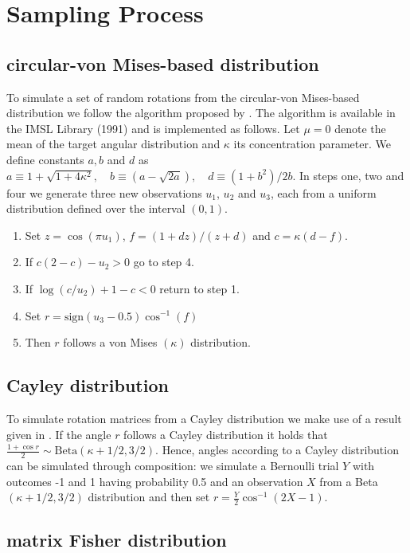 \appendix

\section{Sampling Process}

\subsection{circular-von Mises-based distribution}

To simulate a set of random rotations from the circular-von Mises-based distribution we follow the  algorithm proposed by \citet{best79}.  The algorithm is available in the IMSL Library (1991) and is implemented as follows.  Let $\mu=0$ denote the mean of the target angular distribution and $\kappa$ its concentration parameter.  We define constants $a, b$ and $d$ as
$a\equiv 1+\sqrt{1+4\kappa^2},\quad b\equiv(a-\sqrt{2a}),\quad d\equiv(1+b^2)/2b.$
In steps one, two and four we generate three new observations $u_1$, $u_2$ and $u_3$,  each from a uniform distribution defined over the interval $(0,1)$. 
\begin{enumerate}
\item Set $z=\cos(\pi u_1)$, $f=(1+dz)/(z+d)$ and $c=\kappa(d-f)$.
\item If $c(2-c)-u_2>0$ go to step 4.
\item If $\log(c/u_2)+1-c<0$ return to step 1.
\item Set $r=\text{sign}(u_3-0.5)\cos^{-1}(f)$
\item Then $r$ follows a von Mises $(\kappa)$ distribution.
\end{enumerate}

\subsection{Cayley distribution}\hfill

To simulate rotation matrices from a Cayley distribution we make use of a result given in \citet{leon06}. If the angle $r$ follows a Cayley distribution it holds that $\frac{1+\cos r}{2} \sim \text{Beta}(\kappa+1/2, 3/2)$.  Hence, angles according to a Cayley distribution can be simulated through composition: we simulate a Bernoulli trial $Y$ with outcomes -1 and 1 having probability 0.5 and an observation $X$ from a Beta$(\kappa+1/2, 3/2)$ distribution and then set $r= \frac{Y}{2}\cos^{-1}(2X-1)$. 

\subsection{matrix Fisher distribution}\hfill

